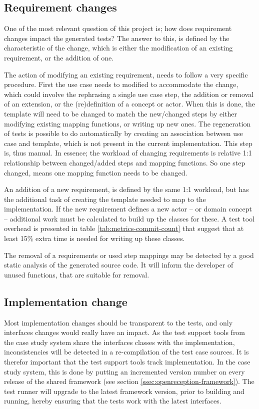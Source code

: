 \subsection{Requirement changes}
One of the most relevant question of this project is; how does requirement changes impact the generated tests? The answer to this, is defined by the characteristic of the change, which is either the modification of an existing requirement, or the addition of one.\medskip

\noindent The action of modifying an existing requirement, needs to follow a very specific procedure. First the use case needs to modified to accommodate the change, which could involve the rephrasing a single use case step, the addition or removal of an extension, or the (re)definition of a concept or actor. When this is done, the template will need to be changed to match the new/changed steps by either modifying existing mapping functions, or writing up new ones. The regeneration of tests is possible to do automatically by creating an association between use case and template, which is not present in the current implementation. This step is, thus manual. In essence; the workload of changing requirements is relative 1:1 relationship between changed/added steps and mapping functions. So one step changed, means one mapping function needs to be changed.\medskip

\noindent An addition of a new requirement, is defined by the same 1:1 workload, but has the additional task of creating the template needed to map to the implementation. If the new requirement defines a new actor -- or domain concept -- additional work must be calculated to build up the classes for these. A test tool overhead is presented in table \ref{tab:metrics-commit-count} that suggest that at least 15\% extra time is needed for writing up these classes.\medskip

\noindent The removal of a requirements or used step mappings may be detected by a good static analysis of the generated source code. It will inform the developer of unused functions, that are suitable for removal.

\subsection{Implementation change}
Most implementation changes should be transparent to the tests, and only interfaces changes would really have an impact. As the test support tools from the case study system share the interfaces classes with the implementation, inconsistencies will be detected in a re-compilation of the test case sources. It is therefor important that the test support tools track implementation. In the case study system, this is done by putting an incremented version number on every release of the shared framework (see section \ref{ssec:openreception-framework}). The test runner will upgrade to the latest framework version, prior to building and running, hereby ensuring that the tests work with the latest interfaces.\medskip

